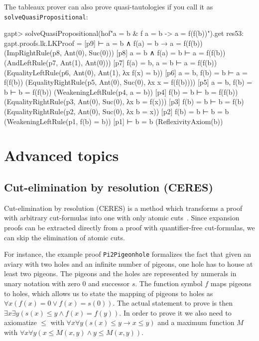 \documentclass[a4paper,11pt]{book}
\newcommand{\impl}{\to} %
\renewcommand{\land}{\wedge}
\renewcommand{\lor}{\vee}
\begin{document}
The tableaux prover can also prove quasi-tautologies if you call it as \texttt{solveQuasiPropositional}:
\begin{clilisting}
gapt> solveQuasiPropositional(hof"a = b & f a = b -> a = f(f(b))").get
res53: gapt.proofs.lk.LKProof =
[p9]  ⊢ a = b ∧ f(a) = b → a = f(f(b))    (ImpRightRule(p8, Ant(0), Suc(0)))
[p8] a = b ∧ f(a) = b ⊢ a = f(f(b))    (AndLeftRule(p7, Ant(1), Ant(0)))
[p7] f(a) = b, a = b ⊢ a = f(f(b))    (EqualityLeftRule(p6, Ant(0), Ant(1), λx f(x) = b))
[p6] a = b, f(b) = b ⊢ a = f(f(b))    (EqualityRightRule(p5, Ant(0), Suc(0), λx x = f(f(b))))
[p5] a = b, f(b) = b ⊢ b = f(f(b))    (WeakeningLeftRule(p4, a = b))
[p4] f(b) = b ⊢ b = f(f(b))    (EqualityRightRule(p3, Ant(0), Suc(0), λx b = f(x)))
[p3] f(b) = b ⊢ b = f(b)    (EqualityRightRule(p2, Ant(0), Suc(0), λx b = x))
[p2] f(b) = b ⊢ b = b    (WeakeningLeftRule(p1, f(b) = b))
[p1]  ⊢ b = b    (ReflexivityAxiom(b))

\end{clilisting}


\chapter{Advanced topics}


\section{Cut-elimination by resolution (CERES)}\label{sec:ceres}

Cut-elimination by resolution (CERES) is a method which transforms a
proof with arbitrary cut-formulas into one with only atomic cuts~\cite{Baaz00CutElimination,Baaz2011}. Since
expansion proofs can be extracted directly from a proof with quantifier-free
cut-formulas, we can skip the elimination of atomic cuts.

For instance, the example proof \texttt{Pi2Pigeonhole} formalizes
the fact that given an aviary with two holes and an infinite number
of pigeons, one hole has to house at least two pigeons. The pigeons and
the holes are represented by numerals in unary notation with zero $0$ and
successor $s$. The function symbol $f$ maps pigeons to holes, which allows us
to state the mapping of pigeons to holes as
$\forall x (f(x) = 0 \lor f(x) = s(0))$. The actual statement to prove is then
$\exists x \exists y (s(x) \leq y \land f(x) = f(y))$. In order to prove it
we also need to axiomatize $\leq$ with
$\forall x \forall y (s(x) \leq y \impl x \leq y)$ 
and a maximum function $M$ with $\forall x \forall y (x \leq M(x,y) \land y\leq M(x,y))$.
\end{document}
